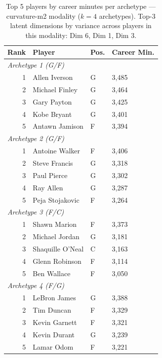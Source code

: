 \begin{table}[htbp]
  \centering\small
  \begin{tabular}{rlll}
    \toprule
    Rank & Player & Pos. & Career Min. \\
    \midrule
    \multicolumn{4}{l}{\textit{Archetype 1 (G/F)}} \\
    \midrule
    1 & Allen Iverson & G & 3,485 \\
    2 & Michael Finley & G & 3,464 \\
    3 & Gary Payton & G & 3,425 \\
    4 & Kobe Bryant & G & 3,401 \\
    5 & Antawn Jamison & F & 3,394 \\
    \midrule[0.4pt]
    \multicolumn{4}{l}{\textit{Archetype 2 (G/F)}} \\
    \midrule
    1 & Antoine Walker & F & 3,406 \\
    2 & Steve Francis & G & 3,318 \\
    3 & Paul Pierce & G & 3,302 \\
    4 & Ray Allen & G & 3,287 \\
    5 & Peja Stojakovic & F & 3,264 \\
    \midrule[0.4pt]
    \multicolumn{4}{l}{\textit{Archetype 3 (F/C)}} \\
    \midrule
    1 & Shawn Marion & F & 3,373 \\
    2 & Michael Jordan & G & 3,181 \\
    3 & Shaquille O'Neal & C & 3,163 \\
    4 & Glenn Robinson & F & 3,114 \\
    5 & Ben Wallace & F & 3,050 \\
    \midrule[0.4pt]
    \multicolumn{4}{l}{\textit{Archetype 4 (F/G)}} \\
    \midrule
    1 & LeBron James & G & 3,388 \\
    2 & Tim Duncan & F & 3,329 \\
    3 & Kevin Garnett & F & 3,321 \\
    4 & Kevin Durant & G & 3,239 \\
    5 & Lamar Odom & F & 3,221 \\
    \bottomrule
  \end{tabular}
  \caption{Top 5 players by career minutes per archetype --- curvature-m2 modality ($k=4$ archetypes). Top-3 latent dimensions by variance across players in this modality: Dim 6, Dim 1, Dim 3.}
  \label{tab:arch_reps_curvature_m2}
\end{table}

